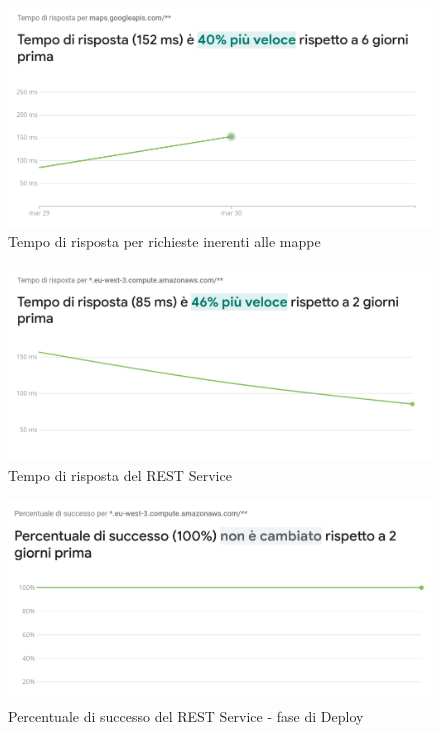 \documentclass{natourDoc}
\begin{document}
\begin{figure}[!htbp]
	\centering
	\includegraphics[width=\textwidth]{./analytics/maps-performance.png}
	\caption{Tempo di risposta per richieste inerenti alle mappe}
\end{figure}
\FloatBarrier

\begin{figure}[!htbp]
	\centering
	\includegraphics[width=\textwidth]{./analytics/response-performance-aws.png}
	\caption{Tempo di risposta del REST Service}
\end{figure}
\FloatBarrier

\begin{figure}[!htbp]
	\centering
	\includegraphics[width=\textwidth]{./analytics/success-performance.png}
	\caption{Percentuale di successo del REST Service - fase di Deploy}
\end{figure}
\FloatBarrier
\end{document}
